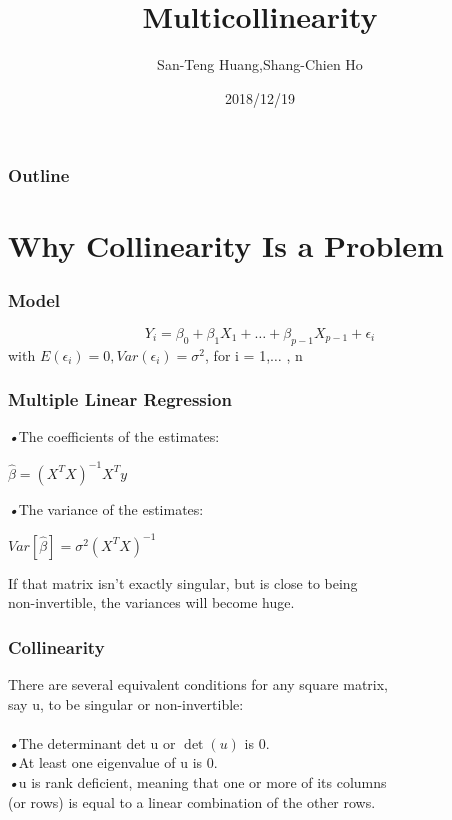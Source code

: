 \documentclass{beamer}
\title{Multicollinearity}
\author{San-Teng Huang,Shang-Chien Ho}
\institute{National Dong Hwa University}
\date{2018/12/19}
\begin{document}
		\begin{frame}
		\titlepage
        \end{frame}
        
        \begin{frame}
		\frametitle{Outline} %
		\tableofcontents %
        \end{frame}


\section{Why Collinearity Is a Problem}
	\begin{frame}
	\frametitle{Model}
	\begin{equation*}
	Y_i = \beta_0 + \beta_1 X_1 + \hdots +\beta_{p-1} X_{p-1}+\epsilon_i
	\end{equation*}
	\qquad \qquad \qquad with $E(\epsilon_i)=0, Var(\epsilon_i)=\sigma^2$, for i = 1,$\hdots$ , n
\end{frame}


    \begin{frame}
      \frametitle{Multiple Linear Regression}
      \emph{•}The  coefficients of the estimates:
      \begin{center}
      	$\hat{\beta}={\left( X^{T} X\right)}^{-1}X^{T} y$
      \end{center}
      \emph{•}The  variance of the estimates:
  	  \begin{center}
  	  	$Var \left[ \hat{\beta}\right] ={\sigma}^2 {\left( X^{T} X\right)}^{-1}$
  	  \end{center}
      \quad If that matrix isn't exactly singular, but is close to being
      \\\quad  non-invertible, the variances will become huge.
      \end{frame}
    
    \begin{frame}
      \frametitle{Collinearity}
      There are several equivalent conditions for any square matrix, 
      \\ say u, to be singular or non-invertible:
      \\\mbox{}
      \\\emph{•}The determinant det u or $\det(u)$ is 0.
      \\\emph{•}At least one eigenvalue of u is 0. 
      \\\emph{•}u is rank deﬁcient, meaning that one or more of its columns
      \\\quad (or rows) is equal to a linear combination of the other rows.
    \end{frame}
         
\end{document}
